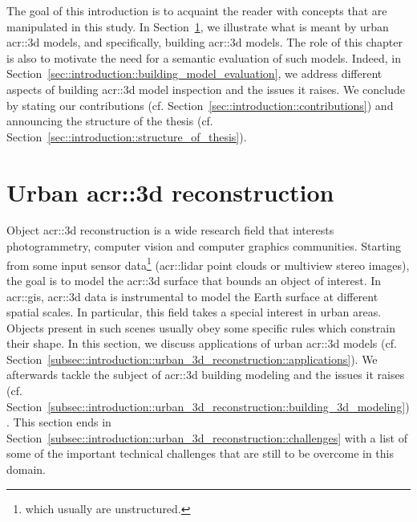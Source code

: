 \minitoc

\vfill

The goal of this introduction is to acquaint the reader with concepts that are manipulated in this study.
In Section~\ref{sec::introduction::urban_3d_reconstruction}, we illustrate what is meant by urban \gls{acr::3d} models, and specifically,  building \gls{acr::3d} models.
The role of this chapter is also to motivate the need for a semantic evaluation of such models.
Indeed, in Section~\ref{sec::introduction::building_model_evaluation}, we address different aspects of building \gls{acr::3d} model inspection and the issues it raises.
We conclude by stating our contributions (cf. Section~\ref{sec::introduction::contributions}) and announcing the structure of the thesis (cf. Section~\ref{sec::introduction::structure_of_thesis}).

\clearpage

\section{Urban \texorpdfstring{\acrshort*{acr::3d}}{3D} reconstruction}
    \label{sec::introduction::urban_3d_reconstruction}
    Object \gls{acr::3d} reconstruction is a wide research field that interests photogrammetry, computer vision and computer graphics communities.
    Starting from some input sensor data\footnote{which usually are unstructured.} (\gls{acr::lidar} point clouds or multiview stereo images), the goal is to model the \gls{acr::3d} surface that bounds an object of interest.
    In \acrfull{acr::gis}, \gls{acr::3d} data is instrumental to model the Earth surface at different spatial scales.
    In particular, this field takes a special interest in urban areas.
    Objects present in such scenes usually obey some specific rules which constrain their shape.
    In this section, we discuss applications of urban \gls{acr::3d} models (cf. Section~\ref{subsec::introduction::urban_3d_reconstruction::applications}).
    We afterwards tackle the subject of  \gls{acr::3d} building modeling and the issues it raises (cf. Section~\ref{subsec::introduction::urban_3d_reconstruction::building_3d_modeling}).
    This section ends in Section~\ref{subsec::introduction::urban_3d_reconstruction::challenges} with a list of some of the important technical challenges that are still to be overcome in this domain.

